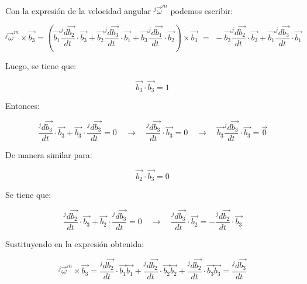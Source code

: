 \documentclass[12pt,letterpaper]{article}
\begin{document}
Con la expresión de la velocidad angular $^{j}\vec{\omega}^{m}$ podemos escribir:

$$ 
^{j}\vec{\omega}^{m} \times \vec{b_{3}} = 
\left( 
\vec{b_1} \frac{^{j} d \vec{b_2} }{dt} \cdot \vec{b_3} +
\vec{b_2} \frac{^{j} d \vec{b_3} }{dt} \cdot \vec{b_1} +
\vec{b_3} \frac{^{j} d \vec{b_1} }{dt} \cdot \vec{b_2}
\right) \times \vec{b_3}
\,\, = \,\,
- \vec{b_2} \frac{^{j} d \vec{b_2} }{dt} \cdot \vec{b_3} +
\vec{b_1} \frac{^{j} d \vec{b_3} }{dt} \cdot \vec{b_1}
$$

Luego, se tiene que:

$$
\vec{b_3} \cdot \vec{b_3} = 1
$$

Entonces:

$$ 
\frac{^{j} d \vec{b_3} }{dt} \cdot \vec{b_3} + \vec{b_3} \cdot \frac{^{j} d \vec{b_3} }{dt} = 0
 \,\,\,\,\,\, \rightarrow \,\,\,\,\,\,
\frac{^{j} d \vec{b_3} }{dt} \cdot \vec{b_3} = 0  
\,\,\,\,\,\, \rightarrow \,\,\,\,\,\,
\vec{b_3} \frac{^{j} d \vec{b_3} }{dt} \cdot \vec{b_3} = \vec{0}
$$

De manera similar para:

$$
\vec{b_2} \cdot \vec{b_3} = 0
$$

Se tiene que:

$$
\frac{^{j} d \vec{b_2} }{dt} \cdot \vec{b_3} + \vec{b_2} \cdot \frac{^{j} d \vec{b_3} }{dt} = 0
 \,\,\,\,\,\, \rightarrow \,\,\,\,\,\,
\frac{^{j} d \vec{b_3} }{dt} \cdot \vec{b_2} = - \frac{^{j} d \vec{b_2} }{dt} \cdot \vec{b_3}
$$

Sustituyendo en la expresión obtenida:

$$
^{j}\vec{\omega}^{m} \times \vec{b_{3}} = 
\frac{^{j} d \vec{b_2} }{dt} \cdot \vec{b_1}  \vec{b_1} +
\frac{^{j} d \vec{b_2} }{dt} \cdot \vec{b_2}  \vec{b_2} +
\frac{^{j} d \vec{b_2} }{dt} \cdot \vec{b_3}  \vec{b_3} = 
\frac{^{j} d \vec{b_3} }{dt}
$$
\end{document}
